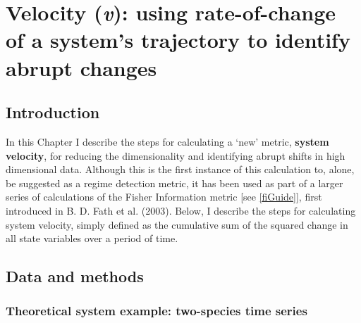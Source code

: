 \documentclass[12pt,twoside,openany]{reedthesis}
\begin{document}
\chapter{\texorpdfstring{Velocity (\emph{v}): using rate-of-change of a
system's trajectory to identify abrupt
changes}{Velocity (v): using rate-of-change of a system's trajectory to identify abrupt changes}}\label{velocity}

\section{Introduction}\label{introduction-3}

In this Chapter I describe the steps for calculating a `new' metric,
\textbf{system velocity}, for reducing the dimensionality and
identifying abrupt shifts in high dimensional data. Although this is the
first instance of this calculation to, alone, be suggested as a regime
detection metric, it has been used as part of a larger series of
calculations of the Fisher Information metric {[}see \ref{fiGuide}{]},
first introduced in B. D. Fath et al. (2003). Below, I describe the
steps for calculating system velocity, simply defined as the cumulative
sum of the squared change in all state variables over a period of time.

\section{Data and methods}\label{data-and-methods-1}

\subsection{Theoretical system example: two-species time
series}\label{theoretical-system-example-two-species-time-series}
\end{document}
